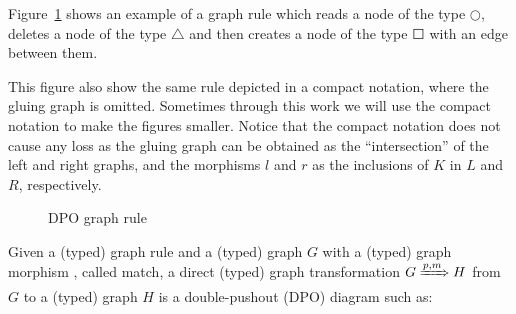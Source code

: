 \begin{example} Figure~\ref{fig:gts:rule_format} shows an example of a graph rule which reads a node of the type $\Circle$, deletes a node of the type $\triangle$ and then creates a node of the type $\Square$ with an edge between them.

This figure also show the same rule depicted in a compact notation, where the gluing graph is omitted. Sometimes through this work we will use the compact notation to make the figures smaller. Notice that the compact notation does not cause any loss as the gluing graph can be obtained as the ``intersection'' of the left and right graphs, and the morphisms $l$ and $r$ as the inclusions of $K$ in $L$ and $R$, respectively.
\begin{figure}[!ht]
  \centering
  \caption{DPO graph rule}\label{fig:gts:rule_format}
\end{figure}
\end{example}

\begin{definition} Given a (typed) graph rule \graphrule{} and a (typed) graph $G$ with a (typed) graph morphism \match, called match, a direct (typed) graph transformation $G \xRightarrow{p,m} H$ from $G$ to a (typed) graph $H$ is a double-pushout (DPO) diagram such as:

\end{definition}

